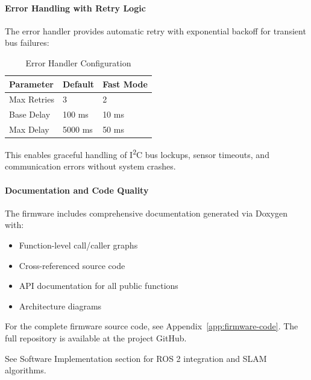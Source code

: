 \paragraph{Error Handling with Retry Logic}

The error handler provides automatic retry with exponential backoff for transient bus failures:

\begin{table}[H]
\centering
\caption{Error Handler Configuration}
\begin{tabular}{@{}lll@{}}
\toprule
\textbf{Parameter} & \textbf{Default} & \textbf{Fast Mode} \\
\midrule
Max Retries & 3 & 2 \\
Base Delay & 100 ms & 10 ms \\
Max Delay & 5000 ms & 50 ms \\
\bottomrule
\end{tabular}
\end{table}

This enables graceful handling of I\textsuperscript{2}C bus lockups, sensor timeouts, and communication errors without system crashes.

\paragraph{Documentation and Code Quality}

The firmware includes comprehensive documentation generated via Doxygen with:
\begin{itemize}
    \item Function-level call/caller graphs
    \item Cross-referenced source code
    \item API documentation for all public functions
    \item Architecture diagrams
\end{itemize}

For the complete firmware source code, see Appendix~\ref{app:firmware-code}. The full repository is available at the project GitHub.

See Software Implementation section for ROS 2 integration and SLAM algorithms.

